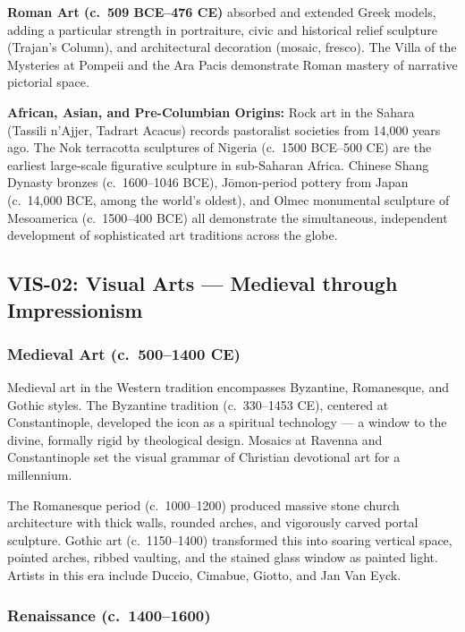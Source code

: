 \documentclass[11pt,letterpaper]{article}
\begin{document}
\textbf{Roman Art (c.~509 BCE--476 CE)} absorbed and extended Greek models, adding a particular strength in portraiture, civic and historical relief sculpture (Trajan's Column), and architectural decoration (mosaic, fresco). The Villa of the Mysteries at Pompeii and the Ara Pacis demonstrate Roman mastery of narrative pictorial space.

\textbf{African, Asian, and Pre-Columbian Origins:} Rock art in the Sahara (Tassili n'Ajjer, Tadrart Acacus) records pastoralist societies from 14,000 years ago. The Nok terracotta sculptures of Nigeria (c.~1500 BCE--500 CE) are the earliest large-scale figurative sculpture in sub-Saharan Africa. Chinese Shang Dynasty bronzes (c.~1600--1046 BCE), Jōmon-period pottery from Japan (c.~14,000 BCE, among the world's oldest), and Olmec monumental sculpture of Mesoamerica (c.~1500--400 BCE) all demonstrate the simultaneous, independent development of sophisticated art traditions across the globe.

\subsection{VIS-02: Visual Arts --- Medieval through Impressionism}

\subsubsection{Medieval Art (c.~500--1400 CE)}

Medieval art in the Western tradition encompasses Byzantine, Romanesque, and Gothic styles. The Byzantine tradition (c.~330--1453 CE), centered at Constantinople, developed the icon as a spiritual technology --- a window to the divine, formally rigid by theological design. Mosaics at Ravenna and Constantinople set the visual grammar of Christian devotional art for a millennium.

The Romanesque period (c.~1000--1200) produced massive stone church architecture with thick walls, rounded arches, and vigorously carved portal sculpture. Gothic art (c.~1150--1400) transformed this into soaring vertical space, pointed arches, ribbed vaulting, and the stained glass window as painted light. Artists in this era include Duccio, Cimabue, Giotto, and Jan Van Eyck.

\subsubsection{Renaissance (c.~1400--1600)}
\end{document}
